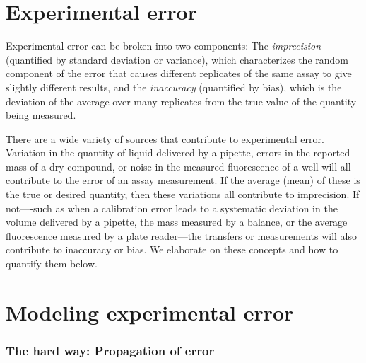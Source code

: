\documentclass[aps,pre,twocolumn,nofootinbib,superscriptaddress,linenumbers]{revtex4-1}
\begin{document}
\section{Experimental error}

Experimental error can be broken into two components: The \emph{imprecision} (quantified by standard deviation or variance), which characterizes the random component of the error that causes different replicates of the same assay to give slightly different results, and the \emph{inaccuracy} (quantified by bias), which is the deviation of the average over many replicates from the true value of the quantity being measured.

There are a wide variety of sources that contribute to experimental error. 
Variation in the quantity of liquid delivered by a pipette, errors in the reported mass of a dry compound, or noise in the measured fluorescence of a well will all contribute to the error of an assay measurement.
If the average (mean) of these is the true or desired quantity, then these variations all contribute to imprecision.
If not----such as when a calibration error leads to a systematic deviation in the volume delivered by a pipette, the mass measured by a balance, or the average fluorescence measured by a plate reader---the transfers or measurements will also contribute to inaccuracy or bias.
We elaborate on these concepts and how to quantify them below.

\section*{Modeling experimental error}

\subsubsection{The hard way: Propagation of error}
\end{document}
